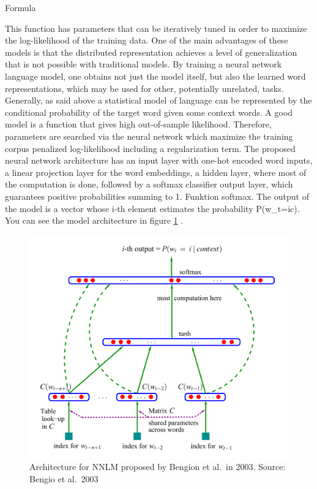 \documentclass[]{krantz}
\begin{document}
Formula

This function has parameters that can be iteratively tuned in order to maximize the log-likelihood of the training data. One of the main advantages of these models is that the distributed representation achieves a level of generalization that is not possible with traditional models. By training a neural network language model, one obtains not just the model itself, but also the learned word representations, which may be used for other, potentially unrelated, tasks.
Generally, as said above a statistical model of language can be represented by the conditional probability of the target word given some context words. A good model is a function that gives high out-of-sample likelihood. Therefore, parameters are searched via the neural network which maximize the training corpus penalized log-likelihood including a regularization term.
The proposed neural network architecture has an input layer with one-hot encoded word inputs, a linear projection layer for the word embeddings, a hidden layer, where most of the computation is done, followed by a softmax classifier output layer, which guarantees positive probabilities summing to 1. Funktion softmax. The output of the model is a vector whose i-th element estimates the probability P(w\_t=i\textbar{}c). You can see the model architecture in figure \ref{fig:bengio-nnlm} .

\begin{figure}
\centering
\includegraphics{figures/01-01-foundations-applications-of-modern-NLP/01-01_bengio_nnlm.png}
\caption{\label{fig:bengio-nnlm}Architecture for NNLM proposed by Bengion et al.~in 2003. Source: Bengio et al.~2003}
\end{figure}
\end{document}
